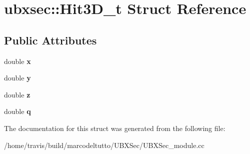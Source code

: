 \hypertarget{structubxsec_1_1Hit3D__t}{\section{ubxsec\-:\-:\-Hit3\-D\-\_\-t \-Struct \-Reference}
\label{structubxsec_1_1Hit3D__t}
}
\subsection*{\-Public \-Attributes}
\begin{DoxyCompactItemize}
\item 
\hypertarget{structubxsec_1_1Hit3D__t_ab4929fe0026546ff06fdf001ecfa5b33}{double {\bfseries x}}\label{structubxsec_1_1Hit3D__t_ab4929fe0026546ff06fdf001ecfa5b33}

\item 
\hypertarget{structubxsec_1_1Hit3D__t_ab5462982ffba0961cd4aa3399efac368}{double {\bfseries y}}\label{structubxsec_1_1Hit3D__t_ab5462982ffba0961cd4aa3399efac368}

\item 
\hypertarget{structubxsec_1_1Hit3D__t_a109099e70c1e956e35cf6d4ecab9ef02}{double {\bfseries z}}\label{structubxsec_1_1Hit3D__t_a109099e70c1e956e35cf6d4ecab9ef02}

\item 
\hypertarget{structubxsec_1_1Hit3D__t_a205dc1ee3dba776b70d58809fdc481aa}{double {\bfseries q}}\label{structubxsec_1_1Hit3D__t_a205dc1ee3dba776b70d58809fdc481aa}

\end{DoxyCompactItemize}


\-The documentation for this struct was generated from the following file\-:\begin{DoxyCompactItemize}
\item 
/home/travis/build/marcodeltutto/\-U\-B\-X\-Sec/\-U\-B\-X\-Sec\-\_\-module.\-cc\end{DoxyCompactItemize}
